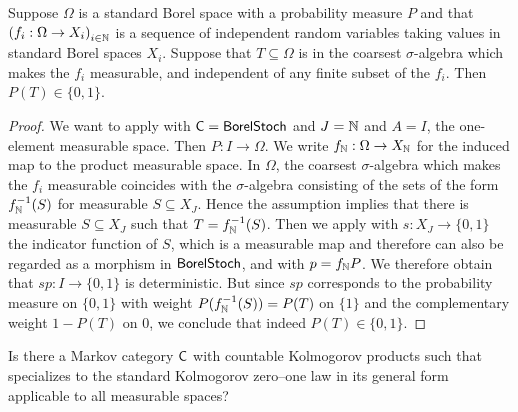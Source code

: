 \documentclass[11pt]{article}
\begin{document}
\begin{corollary}
	Suppose $\Omega$ is a standard Borel space with a probability measure $P$ and that $\left(f_i: \Omega \to X_i\right)_{i \in \mathbb{N}}$ is a sequence of independent random variables taking values in standard Borel spaces $X_i$. Suppose that $T \subseteq \Omega$ is in the coarsest $\sigma$-algebra which makes the $f_i$ measurable, and independent of any finite subset of the $f_i$. Then $P(T) \in \{0,1\}$.
\end{corollary}
\begin{proof}
	We want to apply  with $\mathsf{C} = \operatorname{\mathsf{BorelStoch}}$ and $J = \mathbb{N}$ and $A = I$, the one-element measurable space. Then $P : I \to \Omega$. We write $f_{\mathbb{N}} : \Omega \to X_{\mathbb{N}}$ for the induced map to the product measurable space. In $\Omega$, the coarsest $\sigma$-algebra which makes the $f_i$ measurable coincides with the $\sigma$-algebra consisting of the sets of the form $f_{\mathbb{N}}^{-1}(S)$ for measurable $S \subseteq X_J$. Hence the assumption implies that there is measurable $S \subseteq X_J$ such that $T = f_{\mathbb{N}}^{-1}(S)$. Then we apply  with $s : X_J \to \{0,1\}$ the indicator function of $S$, which is a measurable map and therefore can also be regarded as a morphism in $\operatorname{\mathsf{BorelStoch}}$, and with $p = f_{\mathbb{N}} P$. We therefore obtain that $sp : I \to \{0,1\}$ is deterministic. But since $sp$ corresponds to the probability measure on $\{0,1\}$ with weight $P(f_{\mathbb{N}}^{-1}(S)) = P(T)$ on $\{1\}$ and the complementary weight $1 - P(T)$ on $0$, we conclude that indeed $P(T) \in \{0,1\}$.
\end{proof}

\begin{problem}
	Is there a Markov category $\mathsf{C}$ with countable Kolmogorov products such that  specializes to the standard Kolmogorov zero--one law in its general form applicable to all measurable spaces?
\end{problem}
\end{document}
